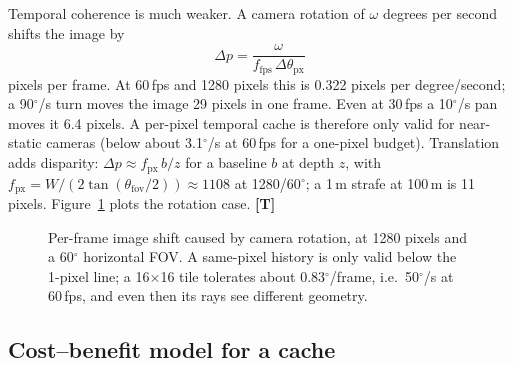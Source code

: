 \documentclass[11pt,a4paper]{article}
\newcommand{\evT}{\textsf{\textbf{\color{evT}[T]}}}
\theoremstyle{plain}
\theoremstyle{definition}
\theoremstyle{remark}
\begin{document}
Temporal coherence is much weaker. A camera rotation of $\omega$ degrees per
second shifts the image by
\begin{equation}
\Delta p = \frac{\omega}{f_{\text{fps}}\,\Delta\theta_{\text{px}}}
\end{equation}
pixels per frame. At 60\,fps and 1280 pixels this is 0.322 pixels per
degree/second; a 90$^\circ$/s turn moves the image 29 pixels in one frame.
Even at 30\,fps a 10$^\circ$/s pan moves it 6.4 pixels. A per-pixel temporal
cache is therefore only valid for near-static cameras (below about
3.1$^\circ$/s at 60\,fps for a one-pixel budget). Translation adds disparity:
$\Delta p\approx f_{\text{px}}\,b/z$ for a baseline $b$ at depth $z$, with
$f_{\text{px}}=W/(2\tan(\theta_{\text{fov}}/2))\approx 1108$ at 1280/60$^\circ$;
a 1\,m strafe at 100\,m is 11 pixels. Figure~\ref{fig:temporal} plots the
rotation case. \evT

\begin{figure}[t]
\centering
{}
\caption{Per-frame image shift caused by camera rotation, at 1280 pixels and a
60$^\circ$ horizontal FOV. A same-pixel history is only valid below the 1-pixel
line; a 16$\times$16 tile tolerates about 0.83$^\circ$/frame, i.e.\ 50$^\circ$/s
at 60\,fps, and even then its rays see different geometry.}
\label{fig:temporal}
\end{figure}

\subsection{Cost--benefit model for a cache}
\end{document}
